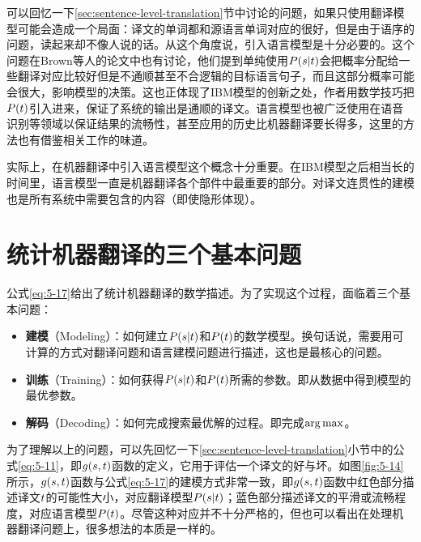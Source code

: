 \parinterval 可以回忆一下\ref{sec:sentence-level-translation}节中讨论的问题，如果只使用翻译模型可能会造成一个局面：译文的单词都和源语言单词对应的很好，但是由于语序的问题，读起来却不像人说的话。从这个角度说，引入语言模型是十分必要的。这个问题在Brown等人的论文中也有讨论，他们提到单纯使用${P}({s}|{t})$会把概率分配给一些翻译对应比较好但是不通顺甚至不合逻辑的目标语言句子，而且这部分概率可能会很大，影响模型的决策。这也正体现了IBM模型的创新之处，作者用数学技巧把${P}({t})$引入进来，保证了系统的输出是通顺的译文。语言模型也被广泛使用在语音识别等领域以保证结果的流畅性，甚至应用的历史比机器翻译要长得多，这里的方法也有借鉴相关工作的味道。

实际上，在机器翻译中引入语言模型这个概念十分重要。在IBM模型之后相当长的时间里，语言模型一直是机器翻译各个部件中最重要的部分。对译文连贯性的建模也是所有系统中需要包含的内容（即使隐形体现）。


\section{统计机器翻译的三个基本问题}

\parinterval 公式\eqref{eq:5-17}给出了统计机器翻译的数学描述。为了实现这个过程，面临着三个基本问题：

\begin{itemize}
\vspace{0.5em}
\item {\small\sffamily\bfseries{建模}}（Modeling）：如何建立${P}({s}|{t})$和${P}({t})$的数学模型。换句话说，需要用可计算的方式对翻译问题和语言建模问题进行描述，这也是最核心的问题。
\vspace{0.5em}
\item {\small\sffamily\bfseries{训练}}（Training）：如何获得${P}({s}|{t})$和${P}({t})$所需的参数。即从数据中得到模型的最优参数。
\vspace{0.5em}
\item {\small\sffamily\bfseries{解码}}（Decoding）：如何完成搜索最优解的过程。即完成$\operatorname*{arg\,max}$。
\vspace{0.5em}
\end{itemize}

\parinterval 为了理解以上的问题，可以先回忆一下\ref{sec:sentence-level-translation}小节中的公式\eqref{eq:5-11}，即$g({s},{t})$函数的定义，它用于评估一个译文的好与坏。如图\ref{fig:5-14}所示，$g({s},{t})$函数与公式\eqref{eq:5-17}的建模方式非常一致，即$g({s},{t})$函数中红色部分描述译文${t}$的可能性大小，对应翻译模型${P}({s}|{t})$；蓝色部分描述译文的平滑或流畅程度，对应语言模型${P}({t})$。尽管这种对应并不十分严格的，但也可以看出在处理机器翻译问题上，很多想法的本质是一样的。

